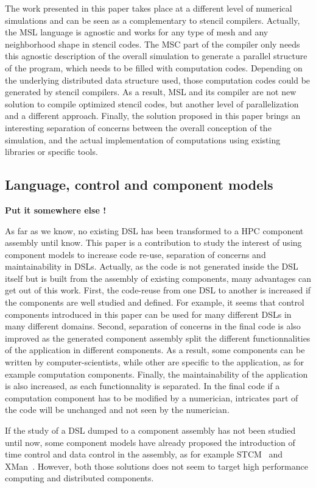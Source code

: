 The work presented in this paper takes place at a different level of numerical simulations and can be seen as a complementary to stencil compilers. Actually, the MSL language is agnostic and works for any type of mesh and any neighborhood shape in stencil codes. The MSC part of the compiler only needs this agnostic description of the overall simulation to generate a parallel structure of the program, which needs to be filled with computation codes. Depending on the underlying distributed data structure used, those computation codes could be generated by stencil compilers. As a result, MSL and its compiler are not new solution to compile optimized stencil codes, but another level of parallelization and a different approach. Finally, the solution proposed in this paper brings an interesting separation of concerns between the overall conception of the simulation, and the actual implementation of computations using existing libraries or specific tools.

\subsection{Language, control and component models}

\textbf{Put it somewhere else !}

As far as we know, no existing DSL has been transformed to a HPC component assembly until know. This paper is a contribution to study the interest of using component models to increase code re-use, separation of concerns and maintainability in DSLs. Actually, as the code is not generated inside the DSL itself but is built from the assembly of existing components, many advantages can get out of this work. First, the code-reuse from one DSL to another is increased if the components are well studied and defined. For example, it seems that control components introduced in this paper can be used for many different DSLs in many different domains. Second, separation of concerns in the final code is also improved as the generated component assembly split the different functionnalities of the application in different components. As a result, some components can be written by computer-scientists, while other are specific to the application, as for example computation components. Finally, the maintainability of the application is also increased, as each functionnality is separated. In the final code if a computation component has to be modified by a numerician, intricates part of the code will be unchanged and not seen by the numerician.

If the study of a DSL dumped to a component assembly has not been studied until now, some component models have already proposed the introduction of time control and data control in the assembly, as for example STCM~\cite{DBLP:confeuropar2008} and XMan~\cite{He12component-baseddesign}. However, both those solutions does not seem to target high performance computing and distributed components.
